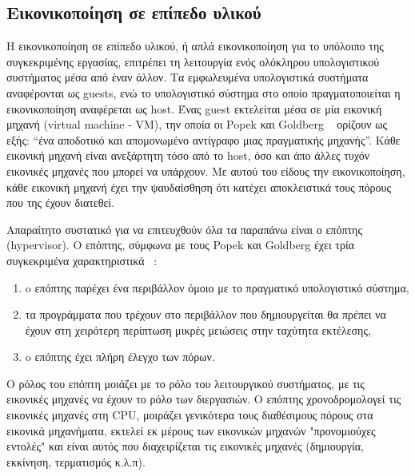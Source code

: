 \subsection{Εικονικοποίηση σε επίπεδο υλικού}

Η εικονικοποίηση σε επίπεδο υλικού, ή απλά εικονικοποίηση για το υπόλοιπο της
συγκεκριμένης εργασίας, επιτρέπει τη λειτουργία ενός ολόκληρου υπολογιστικού
συστήματος μέσα από έναν άλλον. Τα εμφωλευμένα υπολογιστικά συστήματα
αναφέρονται ως guests, ενώ το υπολογιστικό σύστημα στο οποίο πραγματοποιείται η
εικονικοποίηση αναφέρεται ως host. Ένας guest εκτελείται μέσα σε μία εικονική
μηχανή (virtual machine - VM), την οποία οι Popek και Goldberg
~\cite{popek1974formal} ορίζουν ως εξής: “ένα αποδοτικό και απομονωμένο
αντίγραφο μιας πραγματικής μηχανής”. Κάθε εικονική μηχανή είναι ανεξάρτητη τόσο
από το host, όσο και άπο άλλες τυχόν εικονικές μηχανές που μπορεί να υπάρχουν.
Με αυτού του είδους την εικονικοποίηση, κάθε εικονική μηχανή έχει την
ψαυδαίσθηση ότι κατέχει αποκλειστικά τους πόρους που της έχουν διατεθεί.

Απαραίτητο συστατικό για να επιτευχθούν όλα τα παραπάνω είναι ο επόπτης
(hypervisor). Ο επόπτης, σύμφωνα με τους Popek και Goldberg έχει τρία
συγκεκριμένα χαρακτηριστικά ~\cite{popek1974formal}:
\begin{enumerate}
	\item o επόπτης παρέχει ένα περιβάλλον όμοιο με το πραγματικό 
			υπολογιστικό σύστημα,
	\item τα προγράμματα που τρέχουν στο περιβάλλον που δημιουργείται θα
		πρέπει να έχουν στη χειρότερη περίπτωση μικρές μειώσεις στην
		ταχύτητα εκτέλεσης,
	\item o επόπτης έχει πλήρη έλεγχο των πόρων.
\end{enumerate}

Ο ρόλος του επόπτη μοιάζει με το ρόλο του λειτουργικού συστήματος, 
με τις εικονικές μηχανές να έχουν το ρόλο των διεργασιών. Ο επόπτης
χρονοδρομολογεί τις εικονικές μηχανές στη CPU, μοιράζει γενικότερα τους
διαθέσιμους πόρους στα εικονικά μηχανήματα, εκτελεί εκ μέρους των εικονικών
μηχανών "προνομιούχες εντολές" και είναι αυτός που διαχειρίζεται τις εικονικές
μηχανές (δημιουργία, εκκίνηση, τερματισμός κ.λ.π).

